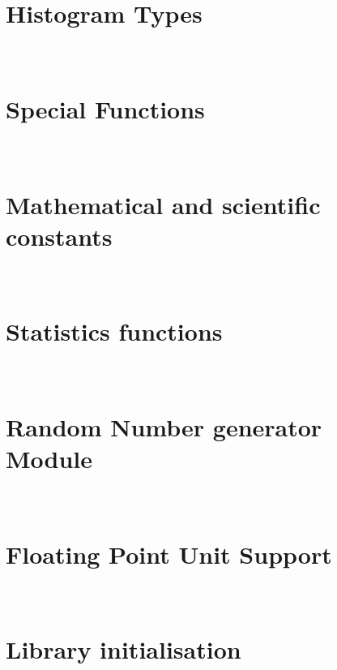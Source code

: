 \documentclass{manual}
\makeatletter
\let\py@OldOldChapter=\chapter
\renewcommand{\chapter}{\py@reset%
                        \py@OldOldChapter}
\makeatother
\begin{document}
\chapter[\protect\module{pygsl.histogram} --- Histogram Types]
{\protect{} \\ Histogram Types}
\label{cha:histogram-module}


\chapter[\protect\module{pygsl.sf} --- Special Functions]
{\protect{} \\ Special Functions}
\label{cha:sf-module}


\chapter[\protect\module{pygsl.const} --- Mathematical and scientific
constants]{\protect{} \\ Mathematical and scientific
constants} 
\label{cha:const-module}


\chapter[\protect\module{pygsl.statistics} --- Statistics
functions]{\protect{} \\ Statistics functions}
\label{cha:statistics-module}


\chapter[\protect\module{pygsl.rng} --- Random Number generator
Module]{\protect{} \\ Random Number generator Module}
\label{cha:rng-module}


\chapter[\protect\module{pygsl.ieee} --- Floating Point Unit Support]
{\protect{} \\ Floating Point Unit Support}
\label{cha:ieee-module}


\chapter[\protect\module{pygsl.init} --- Library initialisation]
{\protect{} \\ Library initialisation}
\label{cha:library-initialisation}

\end{document}
